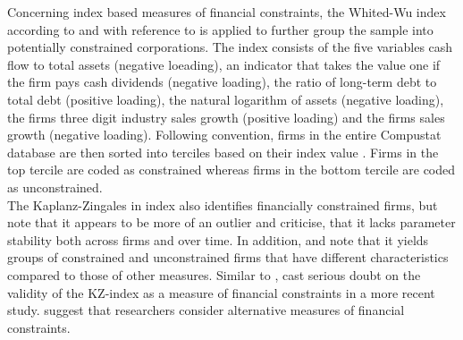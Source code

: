 \documentclass[12pt]{article}
\begin{document}
Concerning index based measures of financial constraints, the Whited-Wu index according to \citet[p.543]{Whited2006} and with reference to \citet[p.38]{Farre-mensa2013} is applied to further group the sample into potentially constrained corporations. The index consists of the five variables cash flow to total assets (negative loeading), an indicator that takes the value one if the firm pays cash dividends (negative loading), the ratio of long-term debt to total debt (positive loading), the natural logarithm of assets (negative loading), the firms three digit industry sales growth (positive loading) and the firms sales growth (negative loading). Following convention, firms in the entire Compustat database are then sorted into terciles based on their index value \citep[p.6]{Farre-mensa2013}. Firms in the top tercile are coded as constrained whereas firms in the bottom tercile are coded as unconstrained.\\
The Kaplanz-Zingales in \citet{as} index also identifies financially constrained firms, but \citet[p.29]{Farre-mensa2013} note that it appears to be more of an outlier and \citet{Whited2006} criticise, that it lacks parameter stability both across firms and over time. In addition, \citet[p.111]{Khatami2014} and \citet[p.1779]{Almeida2004} note that it yields groups of constrained and unconstrained firms that have different characteristics compared to those of other measures. Similar to \citet[p.546]{Whited2006}, \citet[p.1909]{hadlock2010} cast serious doubt on the validity of the KZ-index as a measure of financial constraints in a more recent study. \citet[p.1938]{hadlock2010} suggest that researchers consider alternative measures of financial constraints.\\
\end{document}
